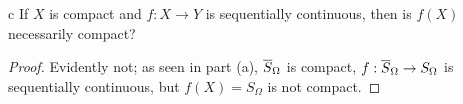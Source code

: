 \documentclass[11pt]{article}
\begin{document}
\begin{p}{c}
  If $X$ is compact and $f: X \to Y$ is sequentially continuous, then is $f(X)$
  necessarily compact?
\end{p}
\begin{proof}
  Evidently not; as seen in part (a), ${ \overline{S} }_\Omega$ is compact, $f:{ \overline{S} }_\Omega
  \to S_\Omega$ is sequentially continuous, but $f(X) = S_\Omega$ is not
  compact.
\end{proof}
\end{document}
